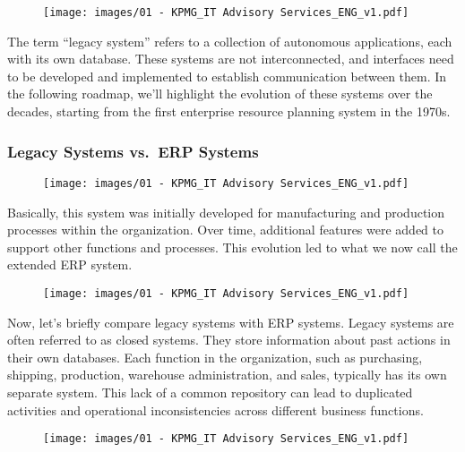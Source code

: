 \begin{figure}[!h]
    \centering
    \texttt{[image: images/01 - KPMG\_IT Advisory Services\_ENG\_v1.pdf]}
\end{figure}

The term ``legacy system'' refers to a collection of autonomous
applications, each with its own database. These systems are not
interconnected, and interfaces need to be developed and implemented to
establish communication between them. In the following roadmap, we'll
highlight the evolution of these systems over the decades, starting from
the first enterprise resource planning system in the 1970s.

\subsubsection{Legacy Systems vs.~ERP
    Systems}\label{legacy-systems-vs.-erp-systems}

\begin{figure}[!h]
    \centering
    \texttt{[image: images/01 - KPMG\_IT Advisory Services\_ENG\_v1.pdf]}
\end{figure}

Basically, this system was initially developed for manufacturing and
production processes within the organization. Over time, additional
features were added to support other functions and processes. This
evolution led to what we now call the extended ERP system.

\begin{figure}[!h]
    \centering
    \texttt{[image: images/01 - KPMG\_IT Advisory Services\_ENG\_v1.pdf]}
\end{figure}

Now, let's briefly compare legacy systems with ERP systems. Legacy
systems are often referred to as closed systems. They store information
about past actions in their own databases. Each function in the
organization, such as purchasing, shipping, production, warehouse
administration, and sales, typically has its own separate system. This
lack of a common repository can lead to duplicated activities and
operational inconsistencies across different business functions.

\begin{figure}[!h]
    \centering
    \texttt{[image: images/01 - KPMG\_IT Advisory Services\_ENG\_v1.pdf]}
\end{figure}

